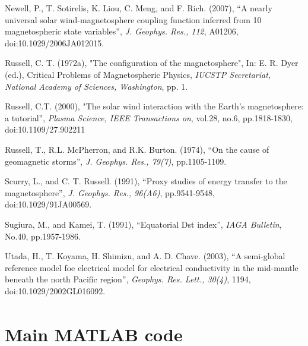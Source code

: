 \documentclass[12pt]{report} %
\begin{document}
\begin{thebibliography}{9}
 Newell, P., T. Sotirelis, K. Liou,  C. Meng,  and F. Rich. (2007), ``A nearly universal solar wind-magnetosphere coupling function inferred from 10 magnetospheric state variables'', \textit{J. Geophys. Res., 112}, A01206, doi:10.1029/2006JA012015.

Russell, C. T. (1972a), "The configuration of the magnetosphere", In: E. R. Dyer (ed.), Critical Problems of Magnetospheric Physics, \textit{IUCSTP Secretariat, National Academy of Sciences, Washington}, pp. 1.

 Russell, C.T. (2000), "The solar wind interaction with the Earth's magnetosphere: a tutorial'', \textit{Plasma Science, IEEE Transactions on}, vol.28, no.6, pp.1818-1830, doi:10.1109/27.902211

 Russell, T., R.L. McPherron, and R.K. Burton. (1974), ``On the cause of geomagnetic storms'', \textit{J. Geophys. Res., 79(7)}, pp.1105-1109.

Scurry, L., and C. T. Russell. (1991), ``Proxy studies of energy transfer to the magnetosphere'', \textit{J. Geophys. Res., 96(A6)}, pp.9541-9548, doi:10.1029/91JA00569.\

 Sugiura, M., and Kamei, T. (1991), ``Equatorial Dst index'', \textit{IAGA Bulletin}, No.40, pp.1957-1986.

 Utada, H., T. Koyama, H. Shimizu, and A. D. Chave. (2003), ``A semi-global reference model foe electrical model for electrical conductivity in the mid-mantle beneath the north Pacific region'', \textit{Geophys. Res. Lett., 30(4)}, 1194, doi:10.1029/2002GL016092.
\end{thebibliography}



\appendix
\chapter{Main MATLAB\textsuperscript{\textregistered} code} \label{chap:app}
\vspace{-15pt}


\end{document}
